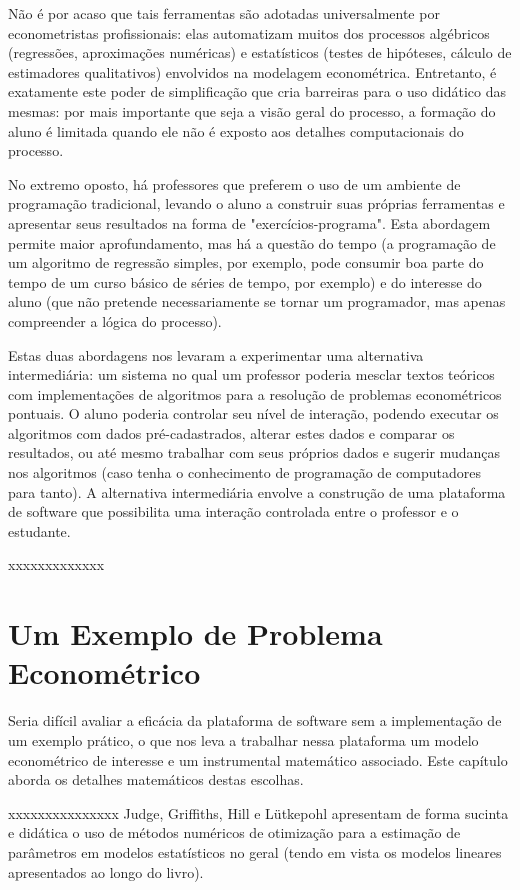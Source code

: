 \documentclass{abnt}
\begin{document}
	Não é por acaso que tais ferramentas são adotadas universalmente por econometristas profissionais: elas automatizam muitos dos processos algébricos (regressões, aproximações numéricas) e estatísticos (testes de hipóteses, cálculo de estimadores qualitativos) envolvidos na modelagem econométrica. Entretanto, é exatamente este poder de simplificação que cria barreiras para o uso didático das mesmas: por mais importante que seja a visão geral do processo, a formação do aluno é limitada quando ele não é exposto aos detalhes computacionais do processo.

No extremo oposto, há professores que preferem o uso de um ambiente de programação tradicional, levando o aluno a construir suas próprias ferramentas e apresentar seus resultados na forma de "exercícios-programa". Esta abordagem permite maior aprofundamento, mas há a questão do tempo (a programação de um algoritmo de regressão simples, por exemplo, pode consumir boa parte do tempo de um curso básico de séries de tempo, por exemplo) e do interesse do aluno (que não pretende necessariamente se tornar um programador, mas apenas compreender a lógica do processo).

	Estas duas abordagens nos levaram a experimentar uma alternativa intermediária: um sistema no qual um professor poderia mesclar textos teóricos com implementações de algoritmos para a resolução de problemas econométricos pontuais. O aluno poderia controlar seu nível de interação, podendo executar os algoritmos com dados pré-cadastrados, alterar estes dados e comparar os resultados, ou até mesmo trabalhar com seus próprios dados e sugerir mudanças nos algoritmos (caso tenha o conhecimento de programação de computadores para tanto). A alternativa intermediária envolve a construção de uma plataforma de software que possibilita uma interação controlada entre o professor e o estudante.

xxxxxxxxxxxxx	\section {Um Exemplo de Problema Econométrico}

Seria difícil avaliar a eficácia da plataforma de software sem a implementação de um exemplo prático, o que nos leva a trabalhar nessa plataforma um modelo econométrico de interesse e um instrumental matemático associado. Este capítulo aborda os detalhes matemáticos destas escolhas.

xxxxxxxxxxxxxxx
	Judge, Griffiths, Hill e Lütkepohl\cite{judge} apresentam de forma sucinta e didática o uso de métodos numéricos de otimização para a estimação de parâmetros em modelos estatísticos no geral (tendo em vista os modelos lineares apresentados ao longo do livro).
\end{document}
